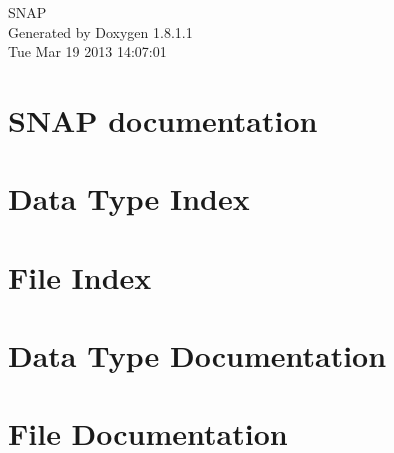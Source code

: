 \documentclass{book}
\begin{document}
\hypersetup{pageanchor=false,citecolor=blue}
\begin{titlepage}
\vspace*{7cm}
\begin{center}
{\Large S\-N\-A\-P }\\
\vspace*{1cm}
{\large Generated by Doxygen 1.8.1.1}\\
\vspace*{0.5cm}
{\small Tue Mar 19 2013 14:07:01}\\
\end{center}
\end{titlepage}
\clearemptydoublepage
{}
\tableofcontents
\clearemptydoublepage
{}
\hypersetup{pageanchor=true,citecolor=blue}
\chapter{S\-N\-A\-P documentation}
\label{index}\hypertarget{index}{}
\chapter{Data Type Index}

\chapter{File Index}

\chapter{Data Type Documentation}



























\chapter{File Documentation}

























\printindex
\end{document}
